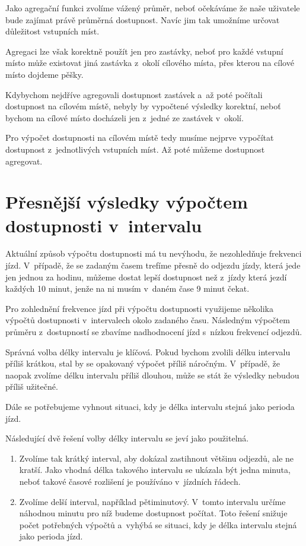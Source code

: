 Jako agregační funkci zvolíme vážený průměr, neboť očekáváme že naše uživatele bude zajímat právě průměrná dostupnost. Navíc jim tak umožníme určovat důležitost vstupních míst.

Agregaci lze však korektně použít jen pro zastávky, neboť pro každé vstupní místo může existovat jiná zastávka z~okolí cílového místa, přes kterou na cílové místo dojdeme pěšky.

Kdybychom nejdříve agregovali dostupnost zastávek a~až poté počítali dostupnost na cílovém místě, nebyly by vypočtené výsledky korektní, neboť bychom na cílové místo docházeli jen z~jedné ze zastávek v~okolí.

Pro výpočet dostupnosti na cílovém místě tedy musíme nejprve vypočítat dostupnost z~jednotlivých vstupních míst. Až poté můžeme dostupnost agregovat.


\section{Přesnější výsledky výpočtem dostupnosti v~intervalu}\label{zobecneni-dostupnostVIntervalu}

Aktuální způsob výpočtu dostupnosti má tu nevýhodu, že nezohledňuje frekvenci jízd. 
V~případě, že se zadaným časem trefíme přesně do odjezdu jízdy, která jede jen jednou za hodinu, můžeme dostat lepší dostupnost než z~jízdy která jezdí každých 10 minut, jenže na ni musím v~daném čase 9 minut čekat.

Pro zohlednění frekvence jízd při výpočtu dostupnosti využijeme několika výpočtů dostupnosti v~intervalech okolo zadaného času. Následným výpočtem průměru z~dostupností se zbavíme nadhodnocení jízd s~nízkou frekvencí odjezdů.

Správná volba délky intervalu je klíčová. Pokud bychom zvolili délku intervalu příliš krátkou, stal by se opakovaný výpočet příliš náročným. V~případě, že naopak zvolíme délku intervalu příliš dlouhou, může se stát že výsledky nebudou příliš užitečné.

Dále se potřebujeme vyhnout situaci, kdy je délka intervalu stejná jako perioda jízd.

Následující dvě řešení volby délky intervalu se jeví jako použitelná.

\begin{enumerate}
    \item Zvolíme tak krátký interval, aby dokázal zastihnout většinu odjezdů, ale ne kratší. Jako vhodná délka takového intervalu se ukázala být jedna minuta, neboť takové časové rozlišení je používáno v~jízdních řádech.
    
    \item Zvolíme delší interval, například pětiminutový. V~tomto intervalu určíme náhodnou minutu pro níž budeme dostupnost počítat. Toto řešení snižuje počet potřebných výpočtů a~vyhýbá se situaci, kdy je délka intervalu stejná jako perioda jízd.
\end{enumerate}

